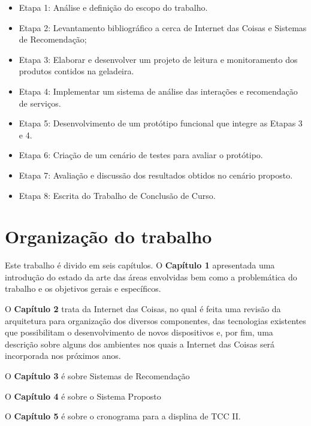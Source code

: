 \begin{itemize}\parskip -1pt
    \item Etapa 1: Análise e definição do escopo do trabalho.
	\item Etapa 2: Levantamento bibliográfico a cerca de Internet das Coisas e Sistemas de Recomendação;
	\item Etapa 3: Elaborar e desenvolver um projeto de leitura e monitoramento dos produtos contidos na geladeira.
	\item Etapa 4: Implementar um sistema de análise das interações e recomendação de serviços.
	\item Etapa 5: Desenvolvimento de um protótipo funcional que integre as Etapas 3 e 4.
	\item Etapa 6: Criação de um cenário de testes para avaliar o protótipo.
	\item Etapa 7: Avaliação e discussão dos resultados obtidos no cenário proposto.
	\item Etapa 8: Escrita do Trabalho de Conclusão de Curso.
\end{itemize}




\section{Organização do trabalho}

Este trabalho é divido em seis capítulos. O \textbf{Capítulo 1} apresentada uma introdução do estado da arte das áreas envolvidas bem como a problemática do trabalho e os objetivos gerais e específicos.

O \textbf{Capítulo 2} trata da Internet das Coisas, no qual é feita uma revisão da arquitetura para organização dos diversos componentes, das tecnologias existentes que possibilitam o desenvolvimento de novos dispositivos e, por fim, uma descrição sobre alguns dos ambientes nos quais a Internet das Coisas será incorporada nos próximos anos.

O \textbf{Capítulo 3} é sobre Sistemas de Recomendação

O \textbf{Capítulo 4} é sobre o Sistema Proposto

O \textbf{Capítulo 5} é sobre o cronograma para a displina de TCC II.

	

